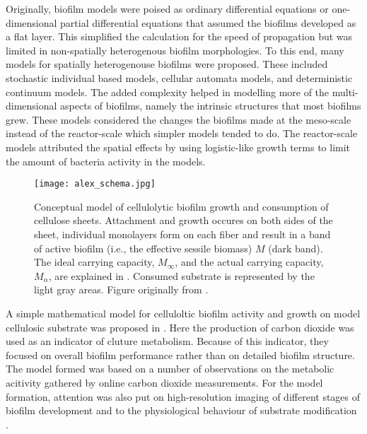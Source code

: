 Originally, biofilm models were poised as ordinary differential equations or one-dimensional partial differential equations that assumed the biofilms developed as a flat layer.
This simplified the calculation for the speed of propagation but was limited in non-spatially heterogenous biofilm morphologies. %
To this end, many models for spatially heterogenouse biofilms were proposed.
These included stochastic individual based models, cellular automata models, and deterministic continuum models. %
The added complexity helped in modelling more of the multi-dimensional aspects of biofilms, namely the intrinsic structures that most biofilms grew.
These models considered the changes the biofilms made at the meso-scale instead of the reactor-scale which simpler models tended to do.
The reactor-scale models attributed the spatial effects by using logistic-like growth terms to limit the amount of bacteria activity in the models. %


\begin{figure}[h!tbp]
  \centering
  \texttt{[image: alex\_schema.jpg]}
  \caption{Conceptual model of cellulolytic biofilm growth and consumption of cellulose sheets. 
    Attachment and growth occures on both sides of the sheet, individual monolayers form on each fiber and result in a band of active biofilm (i.e., the effective sessile biomass) $M$ (dark band). 
    The ideal carrying capacity, $M_{\infty}$, and the actual carrying capacity, $M_{\alpha}$, are explained in \cite{dumitrache2014understanding}.
    Consumed substrate is represented by the light gray areas.
    Figure originally from \cite{dumitrache2015mathematicalModeling}.
  }
  \label{fig:alex_schema}
\end{figure}

A simple mathematical model for celluloltic biofilm activity and growth on model cellulosic substrate was proposed in \cite{dumitrache2014understanding}. 
Here the production of carbon dioxide was used as an indicator of cluture metabolism.
Because of this indicator, they focused on overall biofilm performance rather than on detailed biofilm structure.
The model formed was based on a number of observations on the metabolic acitivity gathered by online carbon dioxide measurements.
For the model formation, attention was also put on high-resolution imaging of different stages of biofilm development \citep{dumitrache2013formFunction} and to the physiological behaviour of substrate modification \citep{dumitrache2013tracking}.

